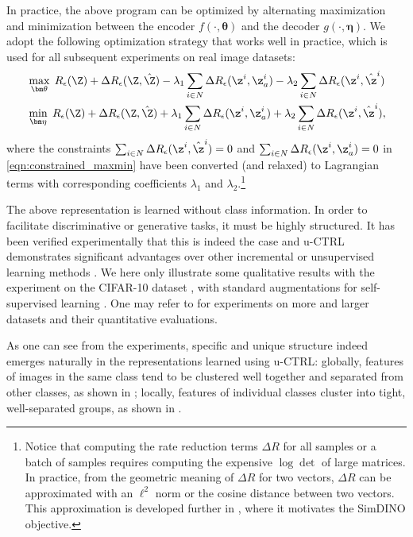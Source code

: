 \documentclass[../../book-main.tex]{subfiles}
\begin{document}
In practice, the above program can be optimized by alternating
maximization and minimization between the encoder $f(\cdot,\bm
\theta)$ and the decoder $g(\cdot,\bm \eta)$. We adopt the following
optimization strategy that works well in practice, which is used for
all subsequent experiments on real image datasets:
\vspace{-1mm}
\begin{align}
&  \max_{\bm \theta}\; R_\epsilon(\Z) + \Delta R_\epsilon(\Z,
\hat{\Z}) -\lambda_{1}\sum_{i\in N} \Delta R_\epsilon(\z^i, \z_{a}^i)
-\lambda_{2}\sum_{i\in N} \Delta R_\epsilon(\z^i, \hat{\z}^i)
\label{eqn:constrained_max} \\
& \min_{\bm \eta}\; R_\epsilon(\Z) + \Delta R_\epsilon(\Z,
\hat{\Z}) +\lambda_{1}\sum_{i\in N} \Delta R_\epsilon(\z^i, \z_{a}^i)+
\lambda_{2}\sum_{i\in N} \Delta R_\epsilon(\z^i, \hat{\z}^i)
\label{eqn:constrained_min},
\end{align}
where the constraints $\sum_{i\in N} \Delta R_\epsilon(\z^i,
\hat{\z}^i) = 0$ and $\sum_{i\in N} \Delta R_\epsilon(\z^i, \z_{a}^i)
= 0$ in \eqref{eqn:constrained_maxmin} have been converted (and
relaxed) to Lagrangian terms with corresponding coefficients
$\lambda_{1}$ and  $\lambda_{2}$.\footnote{Notice that computing the
rate reduction terms $\Delta R$ for all samples or a batch of samples
requires computing the expensive $\log\det$ of large matrices. In
practice, from the geometric meaning of $\Delta R$ for two vectors,
$\Delta R$ can be approximated with an $\ell^2$ norm or the cosine
distance between two vectors. This approximation is developed further
in , where it motivates the SimDINO objective.}

The above representation is learned without class information. In
order to facilitate discriminative or generative tasks, it must be
highly structured. It has been verified experimentally that this is
indeed the case and u-CTRL demonstrates significant advantages over
other incremental or unsupervised learning methods
\cite{pmlr-v234-tong24a}. We here only illustrate some qualitative
results with the experiment on the CIFAR-10 dataset
\cite{krizhevsky2014cifar}, with standard augmentations for
self-supervised learning \cite{chen2020simple}. One may refer to
\cite{pmlr-v234-tong24a} for experiments on more and larger datasets
and their quantitative evaluations.

As one can see from the experiments, specific and unique structure
indeed emerges naturally in the representations learned using u-CTRL:
globally, features of images in the same class tend to be clustered
well together and separated from other classes, as shown in
; locally, features of individual classes cluster into
tight, well-separated groups, as shown in .
\end{document}
